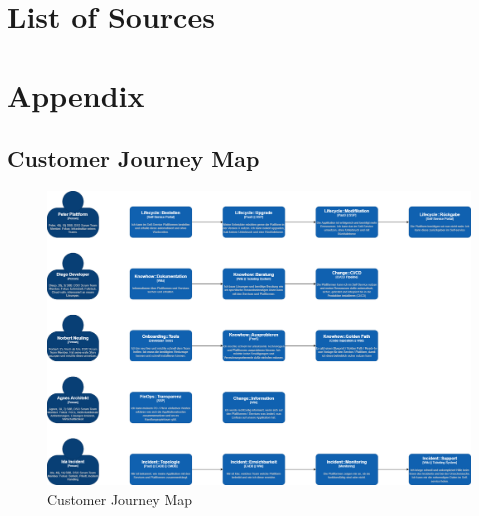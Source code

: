 \documentclass[a4paper,10pt]{article}
\begin{document}
    \pagebreak


    \section{List of Sources}
    \label{sec:bibliograhpy}
    \printbibliography[heading=none]


    \section{Appendix}
    \label{sec:appendix}

    \subsection{Customer Journey Map}
    \label{subsec:cusjourmap}
    \begin{landscape}
        \begin{figure}[h]
            \includegraphics[origin=c,width=0.9\linewidth]{customer-journey.png}
            \caption{Customer Journey Map}
            \label{fig:customerjourney}
        \end{figure}
    \end{landscape}
\end{document}
